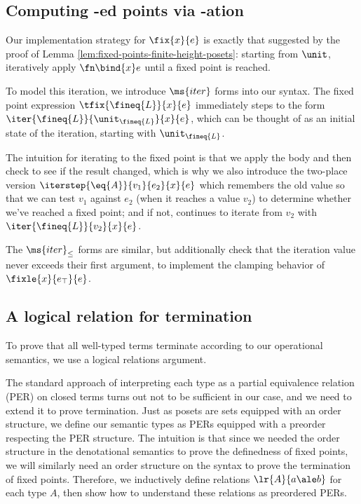
\subsection{Computing -ed points via -ation}

Our implementation strategy for $\fix{x}{e}$ is exactly that suggested by the
proof of Lemma \ref{lem:fixed-points-finite-height-posets}: starting from
$\unit$, iteratively apply $\fn\bind{x} e$ until a fixed point is
reached.

To model this iteration, we introduce $\ms{iter}$ forms into our
syntax.  The fixed point expression $\tfix{\fineq{L}}{x}{e}$
immediately steps to the form
$\iter{\fineq{L}}{\unit_{\fineq{L}}}{x}{e}$, which can be thought of
as an initial state of the iteration, starting with $\unit_{\fineq{L}}$.

The intuition for iterating to the fixed point is that we apply the 
body and then check to see if the result changed, which is why we also 
introduce the two-place version $\iterstep{\eq{A}}{v_1}{e_2}{x}{e}$ 
which remembers the old value so that we can test $v_1$ against $e_2$ (when it
reaches a value $v_2$) to determine
whether we've reached a fixed point; and if not, continues to iterate from
$v_2$ with $\iter{\fineq{L}}{v_2}{x}{e}$. 

The $\ms{iter}_\le$ forms are similar, but additionally check that the iteration
value never exceeds their first argument, to implement the clamping behavior of
$\fixle{x}{e_\top}{e}$.


\subsection{A logical relation for termination}

To prove that all well-typed terms terminate according to our operational
semantics, we use a logical relations argument.

The standard approach of interpreting each type as a partial equivalence
relation (PER) on closed terms turns out not to be sufficient in our case, and
we need to extend it to prove termination. Just as posets are sets equipped with
an order structure, we define our semantic types as PERs equipped with a
preorder respecting the PER structure. The intuition is that since we needed the
order structure in the denotational semantics to prove the definedness of fixed
points, we will similarly need an order structure on the syntax to prove the
termination of fixed points. Therefore, we inductively define relations
$\lr{A}{a \ale b}$ for each type $A$, then show how to understand these
relations as preordered PERs.

